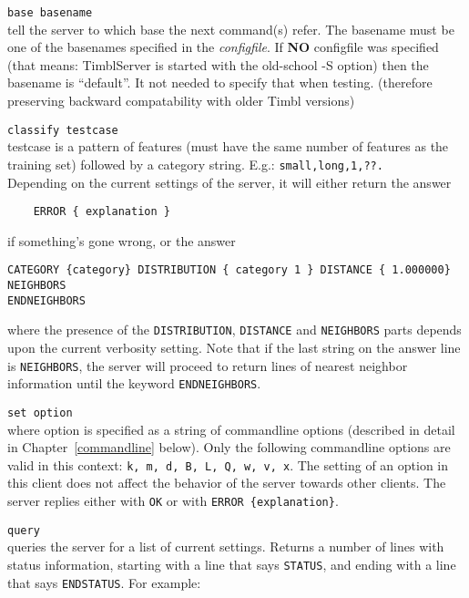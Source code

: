\documentclass{report}
\begin{document}
\begin{description}
\item {\tt base basename}\\
      tell the server to which base the next command(s) refer. The basename must be one of the basenames specified in the {\em configfile}.
If {\bf NO} configfile was specified (that means: TimblServer is started with the old-school -S option) then the basename is ``default''. It not needed to specify that when testing. (therefore preserving backward compatability with older Timbl versions)

\item {\tt classify testcase}\\
      testcase is a pattern of features (must have the same number of
      features as the training set) followed by a category
      string. E.g.: {\tt small,long,1,??.}\\
      Depending on the current settings of the server, it will either
      return the answer 
      \begin{verbatim}
	ERROR { explanation }
      \end{verbatim}
      if something's gone wrong, or the answer
      \begin{verbatim}
CATEGORY {category} DISTRIBUTION { category 1 } DISTANCE { 1.000000} NEIGHBORS
ENDNEIGHBORS
      \end{verbatim}
      where the presence of the {\tt DISTRIBUTION}, {\tt DISTANCE} and {\tt NEIGHBORS}
parts depends upon the current verbosity setting. Note that if the
last string on the answer line is {\tt NEIGHBORS}, the server will
proceed to return lines of nearest neighbor information until the
keyword {\tt ENDNEIGHBORS}.
\item {\tt set option}\\ where option is specified as a string of
      commandline options (described in detail in
      Chapter~\ref{commandline} below). Only the following commandline
      options are valid in this context: {\tt k, m, d, B, L, Q, w, v,
      x}. The setting of an option in this client does not affect the
      behavior of the server towards other clients. The server replies
      either with {\tt OK} or with {\tt ERROR \{explanation\}}.
\item {\tt query}\\
      queries the server for a list of current settings. Returns a
number of lines with status information, starting with a line that
says {\tt STATUS}, and ending with a line that says {\tt ENDSTATUS}. For example:


\end{description}
\end{document}
